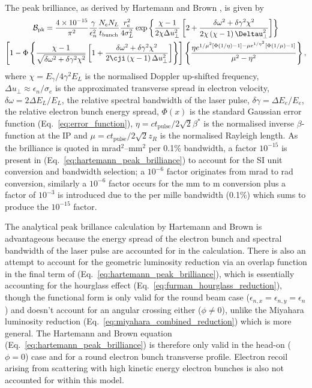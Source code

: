 \documentclass[../main.tex]{subfiles}
\begin{document}
The peak brilliance, as derived by Hartemann and Brown \cite{hartemann2005high}, is given by
\begin{multline}
\mathcal{B}_{\mathrm{pk}} = \frac{4\times 10^{-15}}{\pi^{2}}\frac{\gamma}{\epsilon_{n}^{2}}\frac{N_{e}N_{L}}{t_{\mathrm{bunch}}}\frac{r_{e}^{2}}{4\sigma_{L}^{2}}\exp\left\{\frac{\chi-1}{2\chi\Delta u_{\perp}^{2}}\left[2+\frac{\delta\omega^{2}+\delta\gamma^{2}\chi^{2}}{2\chi\left(\chi-1\right)\Deltau_{\perp}^{2}}\right]\right\} \\ \left[1-\Phi\left\{\frac{\chi-1}{\sqrt{\delta\omega^{2}+\delta\gamma^{2}\chi^{2}}}\left[1+\frac{\delta\omega^{2}+\delta\gamma^{2}\chi^{2}}{2\cji\left(\chi-1\right)\Delta u_{\perp}^{2}}\right]\right\}\right]\left\{\frac{\eta e^{1/\mu^{2}\left[\Phi\left(1/\eta\right)-1\right]-\mu e^{1/\eta^{2}}\left[\Phi\left(1/\mu\right)-1\right]}}{\mu^{2}-\eta^{2}}\right\},
\label{eq:hartemann_peak_brilliance}    
\end{multline}
where $\chi = E_{\gamma}/4\gamma^{2}E_{L}$ is the normalised Doppler up-shifted frequency, $\Delta u_{\perp} \approx \epsilon_{n}/\sigma_{e}$ is the approximated transverse spread in electron velocity,  $\delta\omega = 2\Delta E_{L}/E_{L}$, the relative spectral bandwidth of the laser pulse, $\delta\gamma = \Delta E_{e}/E_{e}$, the relative electron bunch energy spread, $\Phi\left(x\right)$ is the standard Gaussian error function (Eq.~\ref{eq:error_function}), $\eta = ct_{\mathrm{pulse}}/2\sqrt{2}\beta^{*}$ is the normalised inverse $\beta$-function at the IP and $\mu = ct_{\mathrm{pulse}}/2\sqrt{2}z_{R}$ is the normalised Rayleigh length. As the brilliance is quoted in \si{\milli\radian}$^{2}$--\si{\milli\meter}$^{2}$ per 0.1\% bandwidth, a factor $10^{-15}$ is present in (Eq.~\ref{eq:hartemann_peak_brilliance}) to account for the SI unit conversion and bandwidth selection; a $10^{-6}$ factor originates from \si{\milli\radian} to \si{rad} conversion, similarly a $10^{-6}$ factor occurs for the \si{\milli\meter} to \si{\meter} conversion plus a factor of $10^{-3}$ is introduced due to the per mille bandwidth (0.1\%) which sums to produce the $10^{-15}$ factor.

The analytical peak brillance calculation by Hartemann and Brown \cite{hartemann2005high} is advantageous because the energy spread of the electron bunch and spectral bandwidth of the laser pulse are accounted for in the calculation. There is also an attempt to account for the geometric luminosity reduction via an overlap function in the final term of (Eq.~\ref{eq:hartemann_peak_brilliance}), which is essentially accounting for the hourglass effect \cite{furman1991hourglass} (Eq.~\ref{eq:furman_hourglass_reduction}), though the functional form is only valid for the round beam case ($\epsilon_{n,x} = \epsilon_{n,y} = \epsilon_{n}$) and doesn't account for an angular crossing either ($\phi\neq0$), unlike the Miyahara luminosity reduction \cite{miyahara2008luminosity} (Eq.~\ref{eq:miyahara_combined_reduction}) which is more general. The Hartemann and Brown equation (Eq.~\ref{eq:hartemann_peak_brilliance}) is therefore only valid in the head-on ($\phi=0$) case and for a round electron bunch transverse profile. Electron recoil arising from scattering with high kinetic energy electron bunches is also not accounted for within this model.
\end{document}
